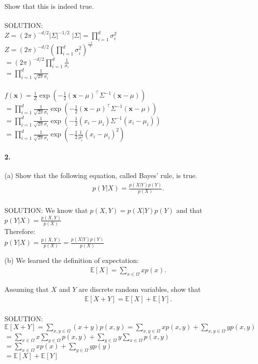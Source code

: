 \documentclass{article}
\newcommand{\vect}[1]{\mathbf{#1}}
\newcommand{\vx}[0]{\vect{x}}
\newcommand{\E}[0]{\mathbb{E}}
\begin{document}
Show that this is indeed true. \\
\\
SOLUTION:\\
$Z = (2\pi)^{-d/2} |\Sigma|^{-1/2}$
$|\Sigma| = \prod_{i = 1}^d \sigma_i^2$ \\
$Z = (2\pi)^{-d/2} (\prod_{i = 1}^d \sigma_i^2)^{\frac{-1}{2}}$ \\
$= (2\pi)^{-d/2}  \prod_{i = 1}^d \frac{1}{\sigma_i}$ \\
$= \prod_{i = 1}^d \frac{1}{\sqrt{2 \pi} \sigma_i}$ \\
\\
$f(\vx) = \frac{1}{Z} \exp\left( 
        -\frac{1}{2} (\vx - \mu)^\top \Sigma^{-1} (\vx - \mu)
    \right)$ \\
$ = \prod_{i = 1}^d \frac{1}{\sqrt{2 \pi} \sigma_i} \exp\left( 
        -\frac{1}{2} (\vx - \mu)^\top \Sigma^{-1} (\vx - \mu)
    \right)$ \\
$ = \prod_{i = 1}^d \frac{1}{\sqrt{2 \pi} \sigma_i} \exp\left( 
        -\frac{1}{2} (x_i - \mu_i) \Sigma^{-1} (x_i - \mu_i)
    \right)$ \\
$ = \prod_{i=1}^d 
    \frac{1}{\sqrt{2\pi} \sigma_i}
    \exp\left(
        -\frac{1}{2} \frac{1}{\sigma_i^2}(x_i - \mu_i)^2
    \right) $
%
\vspace{30mm}

\paragraph{2.}

(a) Show that the following equation, called Bayes' rule, is true.
\begin{align*}
    p(Y|X) = \frac{p(X|Y)p(Y)}{p(X)}.
\end{align*}
\\
SOLUTION: We know that $p(X, Y) = p(X|Y)p(Y)$ and that $p(Y|X) = \frac{p(X, Y)}{p(X)}$\\
Therefore: \\
$p(Y|X) = \frac{p(X, Y)}{p(X)} = \frac{p(X|Y)p(Y)}{p(X)}$

\vspace{15mm}

(b) We learned the definition of expectation:
\begin{align*}
    \E\left[ X \right] = \sum_{x \in \Omega} x p(x). 
\end{align*}

Assuming that $X$ and $Y$ are discrete random variables, show that
\begin{align*}
    \E\left[ X + Y \right] = \E\left[X\right] + \E\left[Y \right].
\end{align*}
\\
SOLUTION: \\
$\E\left[ X + Y \right] = \sum_{x, y \in \Omega} (x + y) p(x, y) = \sum_{x, y \in \Omega} x p(x, y) + \sum_{x, y \in \Omega} y p(x, y)$ \\
$= \sum_{x \in \Omega} x \sum_{y \in \Omega} p(x, y) + \sum_{y \in \Omega} y \sum_{x \in \Omega} p(x, y)$ \\
$= \sum_{x \in \Omega} x p(x) + \sum_{y \in \Omega} y p(y)$ \\
$= \E\left[X\right] + \E\left[Y \right]$
\vspace{15mm}
\end{document}
